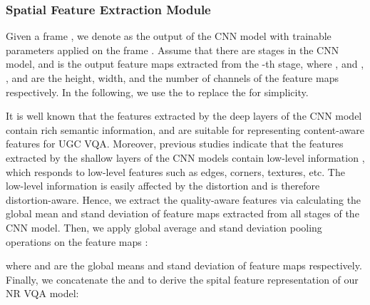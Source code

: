 \documentclass[sigconf]{acmart}
\begin{document}
\subsubsection{Spatial Feature Extraction Module}
\label{spatial_feature_extraction_module}














Given a frame , we denote  as the output of the CNN model  with trainable parameters  applied on the frame . Assume that there are  stages in the CNN model, and  is the output feature maps extracted from the -th stage, where , and , , and  are the height, width, and the number of channels of the feature maps  respectively. In the following, we use the  to replace the  for simplicity.

It is well known that the features extracted by the deep layers of the CNN model contain rich semantic information, and are suitable for representing content-aware features for UGC VQA. Moreover, previous studies indicate that the features extracted by the shallow layers of the CNN models contain low-level information \cite{zeiler2014visualizing, sun2019mc360iqa}, which responds to low-level features such as edges, corners, textures, etc. The low-level information is easily affected by the distortion and is therefore distortion-aware. Hence, we extract the quality-aware features via calculating the global mean and stand deviation of feature maps extracted from all stages of the CNN model.
Then, we apply global average and stand deviation pooling operations on the feature maps :


where  and  are the global means and stand deviation of feature maps  respectively.
Finally, we concatenate the  and  to derive the spital feature representation of our NR VQA model:
\end{document}
